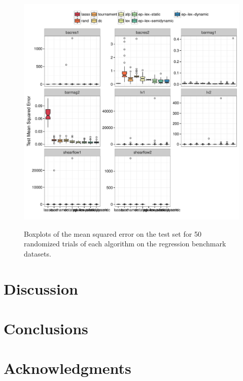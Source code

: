 \documentclass[preprint]{article}
\begin{document}
\begin{figure}
\centering
  \includegraphics[width=\textwidth]{figs/ode_boxplots.pdf}\\
  \caption{Boxplots of the mean squared error on the test set for 50 randomized trials of each algorithm on the regression benchmark datasets.}\label{fig:boxplot_reg}
\end{figure}

\section{Discussion}\label{s:5}


\section{Conclusions}\label{s:6}

\section{Acknowledgments}





\end{document}
